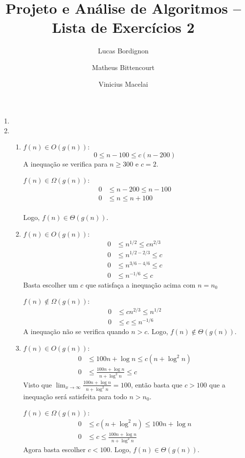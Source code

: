 \documentclass{article}
\title{Projeto e Análise de Algoritmos -- Lista de Exercícios 2}
\author{Lucas Bordignon \and Matheus Bittencourt \and Vinicius Macelai}
\date{}
\begin{document}
\maketitle

\begin{enumerate}
	\item

	\item \begin{enumerate}
		\item $f(n) \in O(g(n))$:
		$$ 0 \le n-100 \le c(n-200) $$
		A inequação se verifica para $n\ge300$ e $c=2$.

		$f(n) \in \Omega(g(n))$:
		\begin{align*}
			0 &\le n-200 \le n-100 \\
			0 &\le n \le n+100 \\
		\end{align*}

		Logo, $f(n) \in \Theta(g(n))$.

		\item $f(n) \in O(g(n))$:
		\begin{align*}
			0 &\le n^{1/2} \le cn^{2/3} \\
			0 &\le n^{1/2-2/3} \le c \\
			0 &\le n^{3/6-4/6} \le c \\
			0 &\le n^{-1/6} \le c
		\end{align*}
		Basta escolher um $c$ que satisfaça a inequação acima com $n=n_0$

		$f(n) \notin \Omega(g(n))$:
		\begin{align*}
			0 &\le cn^{2/3} \le n^{1/2} \\
			0 &\le c \le n^{-1/6}
		\end{align*}
		A inequação não se verifica quando $n > c$. Logo, $f(n) \notin
		\Theta(g(n))$.

		\item $f(n) \in O(g(n))$:
		\begin{align*}
			0 &\le 100n + \log n \le c (n + \log^2 n) \\
			0 &\le \frac{100n + \log n}{n + \log^2 n} \le c
		\end{align*}
		Visto que $\lim_{x\to\infty}\frac{100n + \log n}{n + \log^2 n}=100$,
		então basta que $c>100$ que a inequação será satisfeita para todo
		$n>n_0$.

		$f(n) \in \Omega(g(n))$:
		\begin{align*}
			0 &\le c (n + \log^2 n) \le 100n + \log n \\
			0 &\le c \le \frac{100n + \log n}{n + \log^2 n}
		\end{align*}
		Agora basta escolher $c<100$. Logo, $f(n) \in \Theta(g(n))$.


\end{enumerate}
\end{enumerate}
\end{document}
